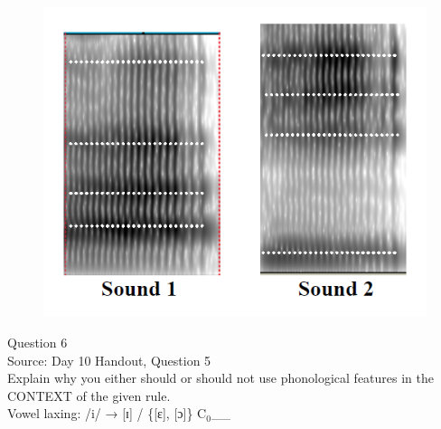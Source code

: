 \documentclass[12pt]{article}
\begin{document}
\begin{figure}[H]
\includegraphics{../images/sound1a_sound2i.png}
\end{figure}

\newpage

{\large Question 6}\\

Source: Day 10 Handout, Question 5\\

Explain why you either should or should not use phonological features in the CONTEXT of the given rule.\\

Vowel laxing: /i/ → {[ɪ]} / \{{[ɛ]}, {[ɔ]}\} C$_0$\_\_


\newpage

\begin{center}
\textbf{{\color{red}{\HUGE END OF EXAM}}}\\

\end{center}
\newpage

\begin{center}
\textbf{{\color{blue}{\HUGE START OF EXAM\\}}}

\textbf{{\color{blue}{\HUGE Student ID: 8951\\}}}

\textbf{{\color{blue}{\HUGE 4:40 - 5:00 PM\\}}}

\end{center}
\newpage
\end{document}
